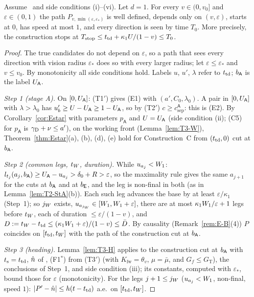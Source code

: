 \begin{proposition}\label{prop:T3-cond}
Assume \TzHT\ and side conditions \textup{(i)--(vi)}. Let $d=1$. For every $v\in(0,v_0]$ and $\varepsilon\in(0,1)$ the path
$P_{v,\min(\varepsilon,\varepsilon_*)}$ is well defined, depends only on $(v,\varepsilon)$, starts at $0$, has speed at most $1$, and
every direction is seen by time $T_0$. More precisely, the construction stops at
$T_{\mathrm{stop}}\le t_{\mathrm{td}}+\kappa_1U/(1-v)\le T_0$.
\end{proposition}
\begin{proof}
The true candidates do not depend on $\varepsilon$, so a path that sees every direction with vision radius $\varepsilon_*$ does so with
every larger radius; let $\varepsilon\le\varepsilon_*$ and $v\le v_0$. By monotonicity all side conditions hold. Labels $u$, $u'$,
$\lambda$ refer to $t_{\mathrm{td}}$; $b_{\mathsf A}$ is the label $U_{\mathsf A}$.

\emph{Step 1 (stage A).} On $[0,U_{\mathsf A}]$: (T1$'$) gives (E1) with $(a',C_0,\lambda_0)$. A pair in $[0,U_{\mathsf A}]$ with $\lambda>\lambda_0$
has $u_b'\ge U-U_{\mathsf A}\ge1-U_{\mathsf A}$, so by (T2$'$) $c\ge c_{\mathrm{sep}}^{\mathsf A}$: this is (E2). By Corollary~\ref{cor:Estar} with
parameters $p_{\mathsf A}$ and $U=U_{\mathsf A}$ (side condition (ii); (C5) for $p_{\mathsf A}$ is $\gamma_{\mathrm D}+\nu\le a'$), on the working front
(Lemma~\ref{lem:T3-W}), Theorem~\ref{thm:Estar}(a), (b), (d), (e) hold for Construction~C from $(t_{\mathrm{td}},0)$ cut at $b_{\mathsf A}$.

\emph{Step 2 (common legs, $t_W$, duration).} While $u_{a_j}<W_1$:
$l_{t_j}(a_j,b_{\mathsf A})\ge U_{\mathsf A}-u_{a_j}>\delta_0+R>\varepsilon$, so the maximality rule gives the same $a_{j+1}$ for the cuts at $b_{\mathsf A}$ and
at $b_{\mathsf E}$, and the leg is non-final in both (as in Lemma~\ref{lem:T2-StA}(b)). Each such leg advances the base by at least
$\varepsilon/\kappa_1$ (Step~1); so $j_W$ exists, $u_{a_{j_W}}\in[W_1,W_1+\varepsilon]$, there are at most
$\kappa_1W_1/\varepsilon+1$ legs before $t_W$, each of duration $\le\varepsilon/(1-v)$, and
$D:=t_W-t_{\mathrm{td}}\le(\kappa_1W_1+\varepsilon)/(1-v)\le\bar D$. By causality (Remark~\ref{rem:E-B}(4)) $P$ coincides on
$[t_{\mathrm{td}},t_W]$ with the path of the construction cut at $b_{\mathsf A}$.

\emph{Step 3 (heading).} Lemma~\ref{lem:T3-H} applies to the construction cut at $b_{\mathsf A}$ with $t_{\mathrm s}=t_{\mathrm{td}}$, $\hat n$ of \TzHT,
(F1$^*$) from (T3$'$) (with $K_{\mathrm{fw}}=\theta_v$, $\mu=\bar\mu$, and $G_f\le G_{\mathrm T}$), the conclusions of Step~1, and side
condition (iii); its constants, computed with $\varepsilon_*$, bound those for $\varepsilon$ (monotonicity). For the legs $j+1\le j_W$ ($u_{a_j}<W_1$, non-final, speed $1$):
$|P'-\hat n|\le h(t-t_{\mathrm{td}})$ a.e.\ on $[t_{\mathrm{td}},t_W]$.


\end{proof}
